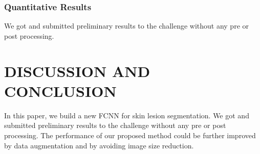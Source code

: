 \documentclass{article}
\begin{document}
\subsubsection{Quantitative Results}
We got and submitted preliminary results to the challenge without any pre or post processing.  



\section{DISCUSSION AND CONCLUSION}
\label{sec:discussion}
In this paper, we build a new FCNN for skin lesion segmentation.  We got and submitted preliminary results to the challenge without any pre or post processing.  The performance of our proposed method could be further improved by data augmentation and by avoiding image size reduction.








\end{document}
